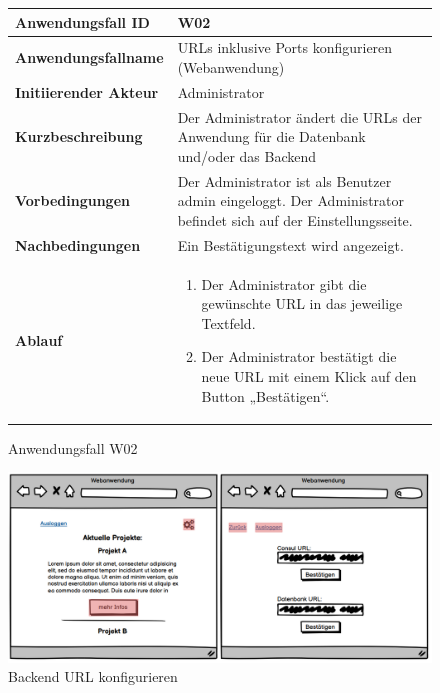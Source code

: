 \begin{figure}[h]
	\centering
	\begin{tabularx}{\textwidth}{ X | X }
		\textbf{Anwendungsfall ID} & W02 \\ \hline
		\textbf{Anwendungsfallname} & URLs inklusive Ports konfigurieren (Webanwendung) \\ \hline
		\textbf{Initiierender Akteur} & Administrator\\ \hline
		\textbf{Kurzbeschreibung} & Der Administrator ändert die URLs der Anwendung für die Datenbank und/oder das Backend  \\ \hline
		\textbf{Vorbedingungen} & Der Administrator ist als Benutzer admin eingeloggt. Der Administrator befindet sich auf der Einstellungsseite.  \\ \hline
		\textbf{Nachbedingungen} & Ein Bestätigungstext wird angezeigt.  \\ \hline
		\textbf{Ablauf} &
			\begin{enumerate}
				\item Der Administrator gibt die gewünschte URL in das jeweilige Textfeld.
				\item Der Administrator bestätigt die neue URL mit einem Klick auf den Button „Bestätigen“.
			\end{enumerate} \\ \hline
	\end{tabularx}
	\caption{Anwendungsfall W02}
	\label{fig:anwendungsfall-app-tabelle-xx-1}
\end{figure}

\begin{figure}[h]
	\centering
	\includegraphics[width=\textwidth]{img/MUurlweb.png}			
	\caption{Backend URL konfigurieren}
	\label{fig:anwendungsfalldiagramm-app}
\end{figure}
